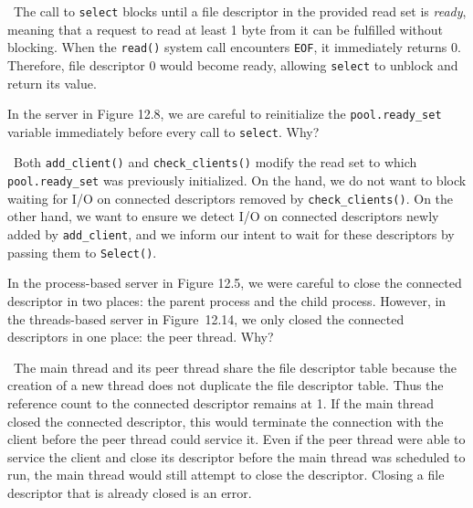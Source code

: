 \documentclass[12pt]{article}
\newenvironment{ex}[2][Exercise]{\begin{trivlist}
		\item[\hskip \labelsep {\bfseries #1}\hskip \labelsep {\bfseries #2.}]}{\end{trivlist}}
\newenvironment{sol}[1][Solution]{\begin{trivlist}
		\item[\hskip \labelsep {\bfseries #1:}]}{\end{trivlist}}
\begin{document}
\begin{sol}
	\
	The call to \texttt{select} blocks until a file descriptor in the provided read set is
	\emph{ready}, meaning that a request to read at least 1 byte from it can be fulfilled
	without blocking. When the \texttt{read()} system call encounters \texttt{EOF}, it immediately
	returns 0. Therefore, file descriptor 0 would become ready, allowing \texttt{select} to unblock
	and return its value.
\end{sol}

\begin{ex}{12.4}
	In the server in Figure 12.8, we are careful to reinitialize the \texttt{pool.ready\_set}
	variable immediately before every call to \texttt{select}. Why?
\end{ex}

\begin{sol}
	\
	Both \texttt{add\_client()} and \texttt{check\_clients()} modify the read set to which
	\texttt{pool.ready\_set} was previously initialized. On the hand, we do not want to block
	waiting for I/O on connected descriptors removed by \texttt{check\_clients()}. On the other
	hand, we want to ensure we detect I/O on connected descriptors newly added by \texttt{add\_client},
	and we inform our intent to wait for these descriptors by passing them to \texttt{Select()}.
\end{sol}

\begin{ex}{12.5}
	In the process-based server in Figure 12.5, we were careful to close the connected descriptor
	in two places: the parent process and the child process. However, in the threads-based server
	in Figure~12.14, we only closed the connected descriptors in one place: the peer thread. Why?
\end{ex}

\begin{sol}
	\
	The main thread and its peer thread share the file descriptor table because the creation
	of a new thread does not duplicate the file descriptor table. Thus the reference count to
	the connected descriptor remains at 1. If the main thread closed the connected descriptor,
	this would terminate the connection with the client before the peer thread could service it.
	Even if the peer thread were able to service the client and close its descriptor before the
	main thread was scheduled to run, the main thread would still attempt to close the descriptor.
	Closing a file descriptor that is already closed is an error.
\end{sol}
\end{document}
